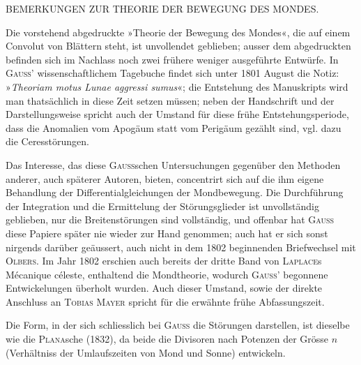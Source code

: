 \clearpage
\begingroup
{}
\renewcommand{\headrulewidth}{0pt}
\begin{center}\large BEMERKUNGEN ZUR THEORIE DER BEWEGUNG DES MONDES.\end{center}

\par\noindent\hspace*{\parindent}Die vorstehend abgedruckte »Theorie der Bewegung des Mondes«, die auf einem Convolut von
Blättern steht, ist unvollendet geblieben; ausser dem abgedruckten befinden sich im Nachlass noch zwei
frühere weniger ausgeführte Entwürfe. In \textsc{Gauss}’ wissenschaftlichem Tagebuche findet sich unter 1801
August die Notiz: »\textit{Theoriam motus Lunae aggressi sumus}«; die Entstehung des Manuskripts wird man
thatsächlich in diese Zeit setzen müssen; neben der Handschrift und der Darstellungsweise spricht auch der
Umstand für diese frühe Entstehungsperiode, dass die Anomalien vom Apogäum statt vom Perigäum gezählt
sind, vgl. dazu die Ceresstörungen.

\par\noindent\hspace*{\parindent}Das Interesse, das diese \textsc{Gauss}schen Untersuchungen gegenüber den Methoden anderer, auch späterer
Autoren, bieten, concentrirt sich auf die ihm eigene Behandlung der Differentialgleichungen der Mondbewegung.
Die Durchführung der Integration und die Ermittelung der Störungsglieder ist unvollständig
geblieben, nur die Breitenstörungen sind vollständig, und offenbar hat \textsc{Gauss} diese Papiere später nie
wieder zur Hand genommen; auch hat er sich sonst nirgends darüber geäussert, auch nicht in dem 1802
beginnenden Briefwechsel mit \textsc{Olbers}. Im Jahr 1802 erschien auch bereits der dritte Band von \textsc{Laplace}s
Mécanique céleste, enthaltend die Mondtheorie, wodurch \textsc{Gauss}’ begonnene Entwickelungen überholt
wurden. Auch dieser Umstand, sowie der direkte Anschluss an \textsc{Tobias Mayer} spricht für die erwähnte
frühe Abfassungszeit.

\par\noindent\hspace*{\parindent}Die Form, in der sich schliesslich bei \textsc{Gauss} die Störungen darstellen, ist dieselbe wie die \textsc{Plana}sche
(1832), da beide die Divisoren nach Potenzen der Grösse \(n\) (Verhältniss der Umlaufszeiten von Mond und
Sonne) entwickeln.

